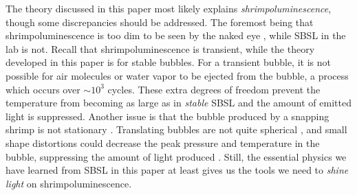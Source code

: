 \documentclass[11pt,prb,aps,nofootinbib,superscriptaddress,floatfix]{revtex4-2}
\begin{document}
The theory discussed in this paper most likely explains \emph{shrimpoluminescence}, though some discrepancies should be addressed. The foremost being that shrimpoluminescence is too dim to be seen by the naked eye \cite{lohse2001snapping},  while SBSL in the lab is not. Recall that shrimpoluminescence is transient, while the theory developed in this paper is for stable bubbles. For a transient bubble, it is not possible for air molecules or water vapor to be ejected from the bubble, a process which occurs over $\sim10^3$ cycles. These extra degrees of freedom prevent the temperature from becoming as large as in \emph{stable} SBSL and the amount of emitted light is suppressed.
Another issue is that the bubble produced by a snapping shrimp is not stationary \cite{lohse1997sonoluminescing,versluis2000snapping}. Translating bubbles are not quite spherical \cite{brenner2002single}, and small shape distortions could decrease the peak pressure and temperature in the bubble, suppressing the amount of light produced \cite{matula2000single}. Still, the essential physics we have learned from SBSL in this paper at least gives us the tools we need to \emph{shine light} on shrimpoluminescence. 





\end{document}
